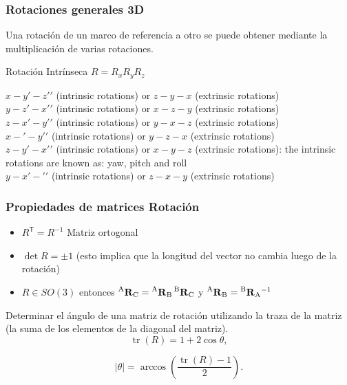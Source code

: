 \begin{frame}
	\frametitle{Rotaciones generales 3D}

	
	Una rotación de un marco de referencia a otro se puede obtener mediante la multiplicación de varias rotaciones.
	
	Rotación Intrínseca
	$R = R_{x} R_{y} R_{z}$
	
	
	
	$x-y\prime-z\prime\prime$ (intrinsic rotations) or $z-y-x$ (extrinsic rotations)\\
	$y-z\prime-x\prime\prime$ (intrinsic rotations) or $x-z-y$ (extrinsic rotations)\\
	$z-x\prime-y\prime\prime$ (intrinsic rotations) or $y-x-z$ (extrinsic rotations)\\
	$x-\prime-y\prime\prime$ (intrinsic rotations) or $y-z-x$ (extrinsic rotations)\\
	$z-y\prime-x\prime\prime$ (intrinsic rotations) or $x-y-z$ (extrinsic rotations): the intrinsic rotations are known as: yaw, pitch and roll\\
	$y-x\prime-\prime\prime$ (intrinsic rotations) or $z-x-y$ (extrinsic rotations)\\
	
	
	
\end{frame}


\begin{frame}
    \frametitle{Propiedades de matrices Rotación}
    \small
    \begin{itemize}
        \item $R^{\mathsf {T}}=R^{-1}$ Matriz ortogonal
        \item $\det R = \pm 1$ (esto implica que la longitud del vector no cambia luego de la rotación)
        \item $R \in SO(3)$ entonces $\prescript{\mathrm{A}}{}{{\boldsymbol{\mathbf{R}}}_\mathrm{C}} = \prescript{\mathrm{A}}{}{{\boldsymbol{\mathbf{R}}}_\mathrm{B}} \prescript{\mathrm{B}}{}{{\boldsymbol{\mathbf{R}}}_\mathrm{C}}$ y $\prescript{\mathrm{A}}{}{{\boldsymbol{\mathbf{R}}}_\mathrm{B}} = \prescript{\mathrm{B}}{}{{\boldsymbol{\mathbf{R}}}_\mathrm{A}}^{-1}$
    \end{itemize}

    Determinar el ángulo de una matriz de rotación utilizando la traza de la matriz (la suma de los elementos de la diagonal del matriz).
    \begin{equation*}
        {\displaystyle \operatorname {tr} (R)=1+2\cos \theta ,}
    \end{equation*}

    \begin{equation*}
        {\displaystyle |\theta |=\arccos \left({\frac {\operatorname {tr} (R)-1}{2}}\right).}
    \end{equation*}

\end{frame}

